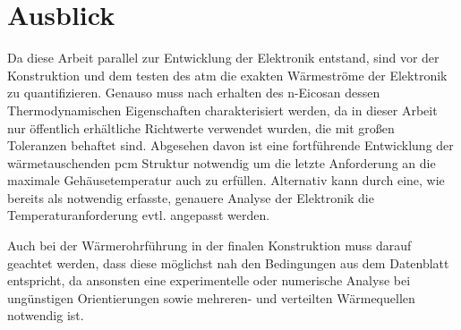 \chapter{Ausblick}
\label{chap:Ausblick}
\pagestyle{OnlySection}		%

Da diese Arbeit parallel zur Entwicklung der Elektronik entstand, sind vor der Konstruktion und dem testen des \ac{atm} die exakten
Wärmeströme der Elektronik zu quantifizieren. Genauso muss nach erhalten des n-Eicosan dessen Thermodynamischen Eigenschaften charakterisiert werden,
da in dieser Arbeit nur öffentlich erhältliche Richtwerte verwendet wurden, die mit großen Toleranzen behaftet sind.
Abgesehen davon ist eine fortführende Entwicklung der wärmetauschenden \ac{pcm} Struktur notwendig um die letzte Anforderung an die maximale
Gehäusetemperatur auch zu erfüllen. Alternativ kann durch eine, wie bereits als notwendig erfasste, genauere Analyse der Elektronik
die Temperaturanforderung evtl. angepasst werden.

Auch bei der Wärmerohrführung in der finalen Konstruktion muss darauf geachtet werden, dass diese möglichst nah den Bedingungen aus
dem Datenblatt entspricht, da ansonsten eine experimentelle oder numerische Analyse bei ungünstigen Orientierungen sowie mehreren- und verteilten Wärmequellen
notwendig ist.